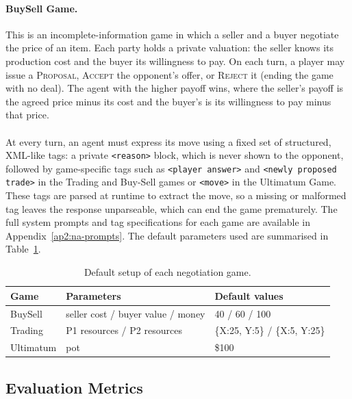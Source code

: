 \paragraph{BuySell Game.}
This is an incomplete-information game in which a seller and a buyer negotiate the price of an item. Each party holds a private valuation: the seller knows its production cost and the buyer its willingness to pay. On each turn, a player may issue a \textsc{Proposal}, \textsc{Accept} the opponent's offer, or \textsc{Reject} it (ending the game with no deal). The agent with the higher payoff wins, where the seller's payoff is the agreed price minus its cost and the buyer's is its willingness to pay minus that price.

\paragraph{}

At every turn, an agent must express its move using a fixed set of structured, XML-like tags: a private \texttt{<reason>} block, which is never shown to the opponent, followed by game-specific tags such as \texttt{<player answer>} and \texttt{<newly proposed trade>} in the Trading and Buy-Sell games or \texttt{<move>} in the Ultimatum Game. These tags are parsed at runtime to extract the move, so a missing or malformed tag leaves the response unparseable, which can end the game prematurely. The full system prompts and tag specifications for each game are available in Appendix~\ref{ap2:na-prompts}. The default parameters used are summarised in Table~\ref{tab:game-setup}.
 
\begin{table}
    \centering
    \caption{Default setup of each negotiation game.}
    \label{tab:game-setup}
    \begin{tabular}{lll}
        \toprule
        \textbf{Game} & \textbf{Parameters} & \textbf{Default values} \\
        \midrule
        BuySell & seller cost / buyer value / money & 40 / 60 / 100 \\
        Trading           & P1 resources / P2 resources       & \{X:25, Y:5\} / \{X:5, Y:25\} \\
        Ultimatum         & pot                               & \$100 \\
        \bottomrule
    \end{tabular}
\end{table}

\subsection{Evaluation Metrics}\label{subsec:eval-metrics}

